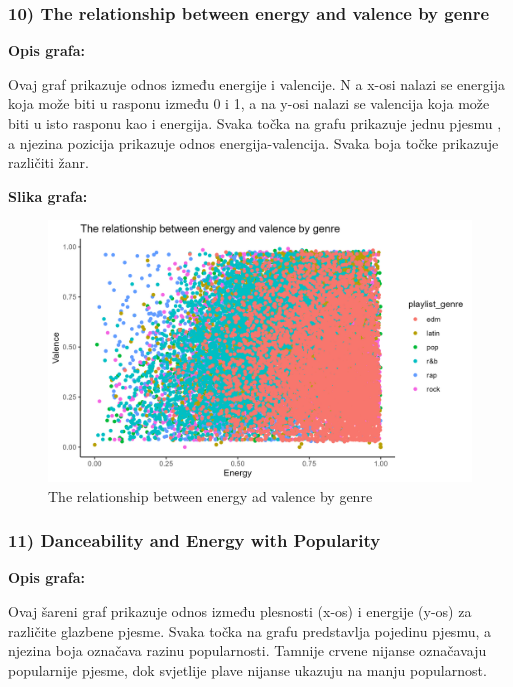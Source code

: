 		\subsubsection{10) The relationship between energy and valence by genre}
    
    \textbf{Opis grafa:}
    
    	Ovaj graf prikazuje odnos između energije i valencije. N a x-osi nalazi se energija koja može biti u rasponu između 0 i 1, a na y-osi nalazi se valencija koja može biti u isto rasponu kao i energija. Svaka točka na grafu prikazuje jednu pjesmu , a njezina pozicija prikazuje odnos energija-valencija. Svaka boja točke prikazuje različiti žanr. 
    
    \textbf{Slika grafa:}
    \begin{figure}[H]
        \includegraphics[scale=0.9]{slike/The relationship between energy and valence by genre.png}
        \centering
        \caption{The relationship between energy ad valence by genre}
        
    \end{figure}

	
		\subsubsection{11) Danceability and Energy with Popularity}
	
	\textbf{Opis grafa:}
	
	Ovaj šareni graf prikazuje odnos između plesnosti (x-os) i energije (y-os) za različite glazbene pjesme. Svaka točka na grafu predstavlja pojedinu pjesmu, a njezina boja označava razinu popularnosti. Tamnije crvene nijanse označavaju popularnije pjesme, dok svjetlije plave nijanse ukazuju na manju popularnost.
	
